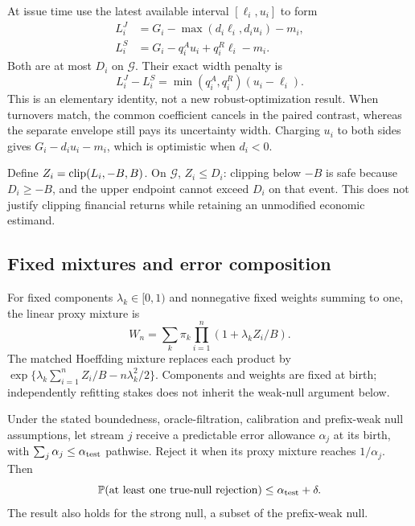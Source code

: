 At issue time use the latest available interval $[\ell_i,u_i]$ to form
\begin{align}
 L^J_i&=G_i-\max(d_i\ell_i,d_i u_i)-m_i,\label{eq:joint}\\
 L^S_i&=G_i-q^A_i u_i+q^R_i\ell_i-m_i.\label{eq:separate}
\end{align}
Both are at most $D_i$ on $\mathcal G$. Their exact width penalty is
\begin{equation}
 L^J_i-L^S_i=\min(q^A_i,q^R_i)(u_i-\ell_i). \label{eq:width}
\end{equation}
This is an elementary identity, not a new robust-optimization result. When
turnovers match, the common coefficient cancels in the paired contrast, whereas
the separate envelope still pays its uncertainty width. Charging $u_i$ to both
sides gives $G_i-d_i u_i-m_i$, which is optimistic when $d_i<0$.

Define $Z_i=\operatorname{clip}(L_i,-B,B)$. On $\mathcal G$, $Z_i\leq D_i$: clipping below
$-B$ is safe because $D_i\geq-B$, and the upper endpoint cannot exceed $D_i$
on that event. This does not justify clipping financial returns while retaining
an unmodified economic estimand.

\subsection{Fixed mixtures and error composition}

For fixed components $\lambda_k\in[0,1)$ and nonnegative fixed weights summing
to one, the linear proxy mixture is
\begin{equation}
 W_n=\sum_k\pi_k\prod_{i=1}^n(1+\lambda_k Z_i/B).\label{eq:wealth}
\end{equation}
The matched Hoeffding mixture replaces each product by
$\exp\{\lambda_k\sum_{i=1}^nZ_i/B-n\lambda_k^2/2\}$.
Components and weights are fixed at birth; independently refitting stakes
does not inherit the weak-null argument below.

\begin{proposition}
\label{prop:composition}
Under the stated boundedness, oracle-filtration, calibration and prefix-weak
null assumptions, let stream $j$ receive a predictable error allowance $\alpha_j$
at its birth, with $\sum_j\alpha_j\leq\alpha_{\rm test}$ pathwise. Reject it
when its proxy mixture reaches $1/\alpha_j$. Then
\[
 \mathbb{P}(\text{at least one true-null rejection})
 \leq\alpha_{\rm test}+\delta.
\]
The result also holds for the strong null, a subset of the prefix-weak null.
\end{proposition}

